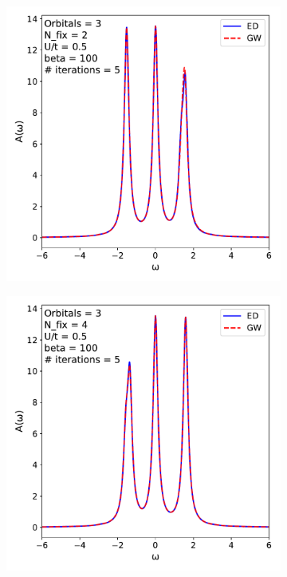 \documentclass[12pt]{article}
\begin{document}
\begin{figure}[h!]
  \centering
  \begin{subfigure}[b]{0.45\textwidth}
    \includegraphics[width=\textwidth]{specgw32.pdf}
  \end{subfigure}
  \hspace{0.02\textwidth}
  \begin{subfigure}[b]{0.45\textwidth}
    \includegraphics[width=\textwidth]{specgw34.pdf}

\end{subfigure}
\end{figure}
\end{document}
